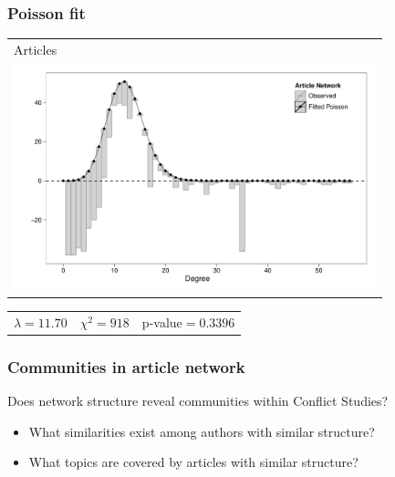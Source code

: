\documentclass[xcolor=dvipsnames, 9pt]{beamer}
\begin{document}
\begin{frame}[fragile]
    \frametitle{Poisson fit}
    \begin{tabular}{l}
        Articles \\
        \includegraphics[width=10.5cm]{../images/articles_fitplot.pdf} \\
    \end{tabular}
    \begin{tabular}{ccc}
        $\lambda=11.70$ & $\chi^{2}=918$ & p-value$=0.3396$
    \end{tabular}
\end{frame}

\begin{frame}[fragile]
    \frametitle{Communities in article network}
        Does network structure reveal communities within Conflict Studies?
        \begin{itemize}
            \item What similarities exist among authors with similar structure?
            \item What topics are covered by articles with similar structure?
        \end{itemize}
\end{frame}
\end{document}
